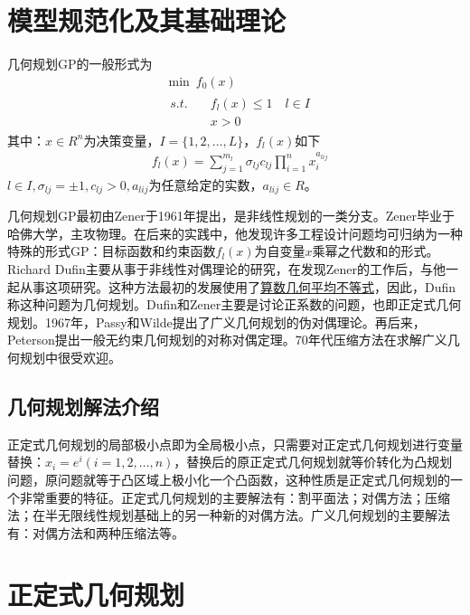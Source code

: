 \section{模型规范化及其基础理论}
    \par
    几何规划GP的一般形式为
    \begin{align*}
    &\mathop{\min}\  f_0(x)\\
    &\begin{aligned}
    s.t.\quad &f_l(x)\leqslant 1\quad l\in I\\
    &x>0
    \end{aligned}
    \end{align*}
    其中：$x\in R^n$为决策变量，$I=\{1,2,\ldots,L\}$，$f_l(x)$如下
    \begin{align*}
    &f_l(x)=\mathop{\sum}\limits_{j=1}^{m_l}{\sigma}_{lj}c_{lj}\mathop{\prod}\limits_{i=1}^{n}x_i^{a_{lij}}
    \end{align*}
    $l\in I,{\sigma}_{lj}=\pm 1,c_{lj} > 0,a_{lij}$为任意给定的实数，$a_{lij}\in R$。
    \par
    几何规划GP最初由Zener于1961年提出，是非线性规划的一类分支。Zener毕业于哈佛大学，主攻物理。在后来的实践中，他发现许多工程设计问题均可归纳为一种特殊的形式GP：目标函数和约束函数$f_l(x)$为自变量$x$乘幂之代数和的形式。Richard Dufin主要从事于非线性对偶理论的研究，在发现Zener的工作后，与他一起从事这项研究。这种方法最初的发展使用了\underline{算数几何平均不等式}，因此，Dufin称这种问题为几何规划。Dufin和Zener主要是讨论正系数的问题，也即正定式几何规划。1967年，Passy和Wilde提出了广义几何规划的伪对偶理论。再后来，Peterson提出一般无约束几何规划的对称对偶定理。70年代压缩方法在求解广义几何规划中很受欢迎。
    \subsection{几何规划解法介绍}
        \par
        正定式几何规划的局部极小点即为全局极小点，只需要对正定式几何规划进行变量替换：$x_i=e^i(i=1,2,\ldots,n)$，替换后的原正定式几何规划就等价转化为凸规划问题，原问题就等于凸区域上极小化一个凸函数，这种性质是正定式几何规划的一个非常重要的特征。正定式几何规划的主要解法有：割平面法；对偶方法；压缩法；在半无限线性规划基础上的另一种新的对偶方法。广义几何规划的主要解法有：对偶方法和两种压缩法等。
\section{正定式几何规划}

